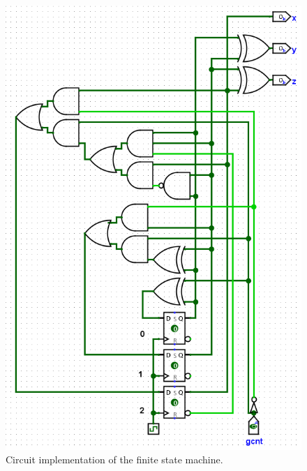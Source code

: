 \documentclass{article}
\begin{document}
\begin{figure}[H]
    \centering
    \includegraphics[width=\textwidth]{./images/3_43_circ.png}
    \caption*{Circuit implementation of the finite state machine.}
\end{figure}
\end{document}
